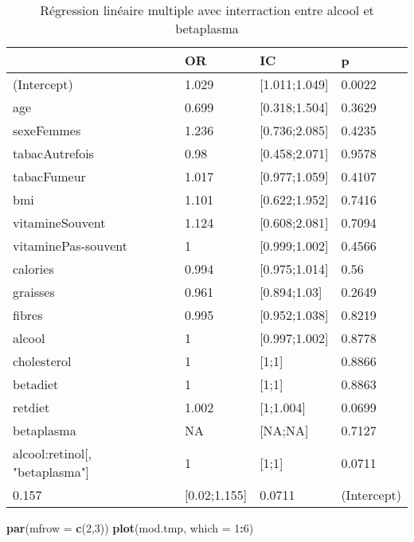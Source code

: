 \documentclass[]{article}
\newenvironment{Shaded}{\begin{snugshade}}{\end{snugshade}}
\newcommand{\KeywordTok}[1]{\textcolor[rgb]{0.13,0.29,0.53}{\textbf{#1}}}
\newcommand{\DataTypeTok}[1]{\textcolor[rgb]{0.13,0.29,0.53}{#1}}
\newcommand{\DecValTok}[1]{\textcolor[rgb]{0.00,0.00,0.81}{#1}}
\newcommand{\OperatorTok}[1]{\textcolor[rgb]{0.81,0.36,0.00}{\textbf{#1}}}
\newcommand{\NormalTok}[1]{#1}
\begin{document}
\begin{table}

\caption{\label{tab:unnamed-chunk-91}Régression linéaire multiple avec interraction entre alcool et betaplasma}
\centering
\begin{tabular}[t]{l|l|l|l}
\hline
  & OR & IC & p\\
\hline
\rowcolor[HTML]{BBD2E1}  (Intercept) & 1.029 & [1.011;1.049] & 0.0022\\
\hline
age & 0.699 & [0.318;1.504] & 0.3629\\
\hline
\rowcolor[HTML]{BBD2E1}  sexeFemmes & 1.236 & [0.736;2.085] & 0.4235\\
\hline
tabacAutrefois & 0.98 & [0.458;2.071] & 0.9578\\
\hline
\rowcolor[HTML]{BBD2E1}  tabacFumeur & 1.017 & [0.977;1.059] & 0.4107\\
\hline
bmi & 1.101 & [0.622;1.952] & 0.7416\\
\hline
\rowcolor[HTML]{BBD2E1}  vitamineSouvent & 1.124 & [0.608;2.081] & 0.7094\\
\hline
vitaminePas-souvent & 1 & [0.999;1.002] & 0.4566\\
\hline
\rowcolor[HTML]{BBD2E1}  calories & 0.994 & [0.975;1.014] & 0.56\\
\hline
graisses & 0.961 & [0.894;1.03] & 0.2649\\
\hline
\rowcolor[HTML]{BBD2E1}  fibres & 0.995 & [0.952;1.038] & 0.8219\\
\hline
alcool & 1 & [0.997;1.002] & 0.8778\\
\hline
\rowcolor[HTML]{BBD2E1}  cholesterol & 1 & [1;1] & 0.8866\\
\hline
betadiet & 1 & [1;1] & 0.8863\\
\hline
\rowcolor[HTML]{BBD2E1}  retdiet & 1.002 & [1;1.004] & 0.0699\\
\hline
betaplasma & NA & [NA;NA] & 0.7127\\
\hline
\rowcolor[HTML]{BBD2E1}  alcool:retinol[, "betaplasma"] & 1 & [1;1] & 0.0711\\
\hline
0.157 & [0.02;1.155] & 0.0711 & (Intercept)\\
\hline
\end{tabular}
\end{table}

\begin{Shaded}
\begin{Highlighting}[]
\KeywordTok{par}\NormalTok{(}\DataTypeTok{mfrow =} \KeywordTok{c}\NormalTok{(}\DecValTok{2}\NormalTok{,}\DecValTok{3}\NormalTok{))}
\KeywordTok{plot}\NormalTok{(mod.tmp, }\DataTypeTok{which =} \DecValTok{1}\OperatorTok{:}\DecValTok{6}\NormalTok{)}
\end{Highlighting}
\end{Shaded}
\end{document}
